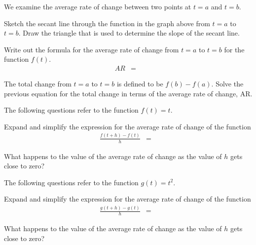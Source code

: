 \begin{problem}
\item We examine the average rate of change between two points at
  $t=a$ and $t=b$.

  \scalebox{0.7}{}

  \begin{subproblem}
  \item Sketch the secant line through the function in the graph above
    from $t=a$ to $t=b$. Draw the triangle that is used to determine
    the slope of the secant line.
  \item Write out the formula for the average rate of change from
    $t=a$ to $t=b$ for the function $f(t)$. 
    \begin{eqnarray*}
      AR & = & 
    \end{eqnarray*}
  \item The total change from $t=a$ to $t=b$ is defined to be
    $f(b)-f(a)$. Solve the previous equation for the total change in
    terms of the average rate of change, AR.
    \vspace{3em}
  \end{subproblem}

  \clearpage

  \item The following questions refer to the function $f(t)=t$.
    \begin{subproblem}
    \item Expand and simplify the expression for the average rate of
      change of the function
      \begin{eqnarray*}
        \frac{f(t+h)-f(t)}{h} & = & 
      \end{eqnarray*}
      \vspace{3em}
    \item What happens to the value of the average rate of change as
      the value of $h$ gets close to zero?
      \vspace{3em}
    \end{subproblem}

  \item The following questions refer to the function $g(t)=t^2$.
    \begin{subproblem}
    \item Expand and simplify the expression for the average rate of
      change of the function
      \begin{eqnarray*}
        \frac{g(t+h)-g(t)}{h} & = & 
      \end{eqnarray*}
      \vspace{3em}
    \item What happens to the value of the average rate of change as
      the value of $h$ gets close to zero?
      \vspace{3em}
    \end{subproblem}


\end{problem}
